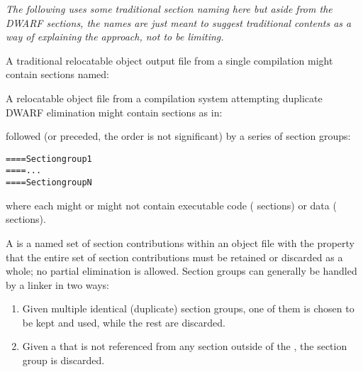 \textit{The following uses some traditional section naming here
but aside from the DWARF sections, the names are just meant
to suggest traditional contents as a way of explaining the
approach, not to be limiting.}

A traditional relocatable object output file
from a single compilation might contain sections 
named:
\begin{alltt}
    \dotdata{}
    \dottext{}
    \dotdebuginfo{}
    \dotdebugabbrev{}
    \dotdebugline{}
    \dotdebugaranges{}
\end{alltt}
A relocatable object file from a compilation system 
attempting duplicate DWARF elimination might
contain sections as in:

\begin{alltt}
    \dotdata{}
    \dottext{}
    \dotdebuginfo{}
    \dotdebugabbrev{}
    \dotdebugline{}
    \dotdebugaranges{}
\end{alltt}

followed (or preceded, the order is not significant) 
by a series of 
section groups:
\begin{alltt}
==== Section group 1
    \dotdebuginfo{}
    \dotdebugabbrev{}
    \dotdebugline{}
==== ...
==== Section group N
    \dotdebuginfo{}
    \dotdebugabbrev{}
    \dotdebugline{}
\end{alltt}

where each  might or might not contain executable
code (\dottext{} sections) or data (\dotdata{} sections).

A \textit{} is a named set 
of section contributions
within an object file with the property that the entire set
of section contributions must be retained or discarded as a
whole; no partial elimination is allowed. Section groups can
generally be handled by a linker in two ways:
\begin{enumerate}[1. ]

\item Given multiple identical (duplicate) section groups,
one of them is chosen to be kept and used, while the rest
are discarded.

\item Given a  
that is not referenced from any
section outside of the , 
the section group
is discarded.

\end{enumerate}


